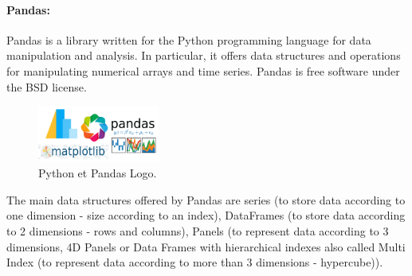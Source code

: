 \paragraph{Pandas:} 

Pandas\cite{PandasPythonData} is a library written for the Python programming language for data manipulation and analysis. In particular, it offers data structures and operations for manipulating numerical arrays and time series. Pandas is free software under the BSD license.


\begin{figure}
	\vspace{-10pt}
	\includegraphics[width=4cm]{images/chapter4/python_pandas.png}
	\vspace{-10pt}
	\caption{{\footnotesize Python et Pandas Logo.}}
\end{figure}


The main data structures offered by Pandas are series (to store data according to one dimension - size according to an index), DataFrames (to store data according to 2 dimensions - rows and columns), Panels (to represent data according to 3 dimensions, 4D Panels or Data Frames with hierarchical indexes also called Multi Index (to represent data according to more than 3 dimensions - hypercube))\cite{Pandas2020}.



